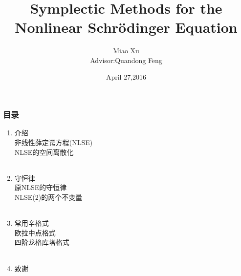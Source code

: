 \documentclass[cjk]{beamer}
\title{Symplectic Methods for the Nonlinear Schr\"{o}dinger Equation}
\author{Miao Xu\\Advisor:Quandong Feng}
\date{\footnotesize \vspace{5mm}April 27,2016}
\begin{document}

    \begin{frame} %

        \titlepage 

    \end{frame}

    \begin{frame}
     \frametitle{目录}
     \begin{enumerate}
\normalsize

     \item 介绍\\
非线性薛定谔方程(NLSE)\\
NLSE的空间离散化\\

     \qquad\\
     \item 守恒律\\
原NLSE的守恒律\\
NLSE(2)的两个不变量\\
     \qquad\\
     \item 常用辛格式\\
欧拉中点格式\\
四阶龙格库塔格式\\
     \qquad\\
 \item 致谢\\
     \end{enumerate}
    \end{frame}
\end{document}
